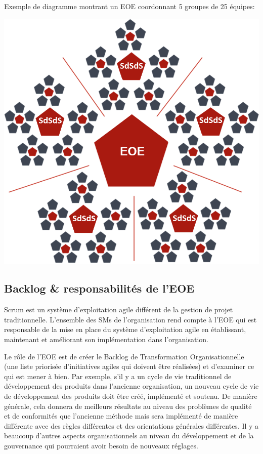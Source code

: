 \documentclass[12pt,a4paper,parskip=full]{scrartcl}
\begin{document}
\pagebreak
Exemple de diagramme montrant un EOE coordonnant 5 groupes de 25 équipes:

\includegraphics[width=1.0\linewidth]{SdS-EOE.png}

\subsection{Backlog \& responsabilités de l’EOE}
Scrum est un système d’exploitation agile différent de la gestion de projet traditionnelle.
L’ensemble des SMs de l’organisation rend compte à l’EOE qui est responsable de la mise
en place du système d’exploitation agile en établissant, maintenant et améliorant son
implémentation dans l’organisation.

Le rôle de l’EOE est de créer le Backlog de Transformation Organisationnelle (une liste
priorisée d’initiatives agiles qui doivent être réalisées) et d’examiner ce qui est mener à
bien. Par exemple, s’il y a un cycle de vie traditionnel de développement des produits dans
l’ancienne organisation, un nouveau cycle de vie de développement des produits doit être
créé, implémenté et soutenu. De manière générale, cela donnera de meilleurs résultats au
niveau des problèmes de qualité et de conformités que l’ancienne méthode mais sera
implémenté de manière différente avec des règles différentes et des orientations
générales différentes. Il y a beaucoup d’autres aspects organisationnels au niveau du
développement et de la gouvernance qui pourraient avoir besoin de nouveaux réglages.
\end{document}
